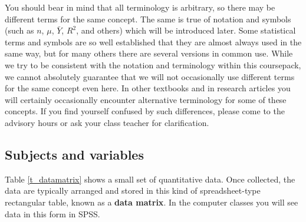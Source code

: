 You should bear in mind that all terminology is arbitrary, so there may
be different terms for the same concept. The same is true of notation
and symbols (such as $n$, $\mu$, $\bar{Y}$, $R^{2}$, and others) which
will be introduced later. Some statistical terms and symbols are so well
established that they are almost always used in the same way, but for
many others there are several versions in common use. While we try to be
consistent with the notation and terminology within this coursepack, we
cannot absolutely guarantee that we will not occasionally use different
terms for the same concept even here. In other textbooks
and in research articles you will certainly occasionally
encounter alternative terminology for some of these concepts. If you
find yourself confused by such differences, please come to the advisory
hours or ask your class teacher for clarification.

\subsection{Subjects and variables}
\label{ss_intro_def_subj}

Table \ref{t_datamatrix} shows a small set of quantitative data. Once
collected, the  data are typically arranged and stored in this kind of
spreadsheet-type rectangular table, known as a \textbf{data
matrix}. In the computer classes
you will see data in this form in
SPSS.

